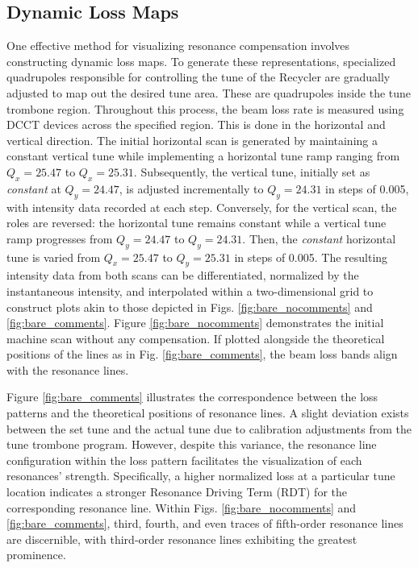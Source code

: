 \subsection{\label{sec:lossmaps}Dynamic Loss Maps}

One effective method for visualizing resonance compensation involves constructing dynamic loss maps. To generate these representations, specialized quadrupoles responsible for controlling the tune of the Recycler are gradually adjusted to map out the desired tune area. These are quadrupoles inside the tune trombone region. Throughout this process, the beam loss rate is measured using DCCT devices across the specified region. This is done in the horizontal and vertical direction. The initial horizontal scan is generated by maintaining a constant vertical tune while implementing a horizontal tune ramp ranging from $Q_x=25.47$ to $Q_x=25.31$. Subsequently, the vertical tune, initially set as \textit{constant} at $Q_y=24.47$, is adjusted incrementally to $Q_y=24.31$ in steps of 0.005, with intensity data recorded at each step. Conversely, for the vertical scan, the roles are reversed: the horizontal tune remains constant while a vertical tune ramp progresses from $Q_y=24.47$ to $Q_y=24.31$. Then, the \textit{constant} horizontal tune is varied from $Q_x=25.47$ to $Q_y=25.31$ in steps of 0.005. The resulting intensity data from both scans can be differentiated, normalized by the instantaneous intensity, and interpolated within a two-dimensional grid to construct plots akin to those depicted in Figs. \ref{fig:bare_nocomments} and \ref{fig:bare_comments}. Figure \ref{fig:bare_nocomments} demonstrates the initial machine scan without any compensation. If plotted alongside the theoretical positions of the lines as in Fig. \ref{fig:bare_comments}, the beam loss bands align with the resonance lines. 

Figure \ref{fig:bare_comments} illustrates the correspondence between the loss patterns and the theoretical positions of resonance lines. A slight deviation exists between the set tune and the actual tune due to calibration adjustments from the tune trombone program. However, despite this variance, the resonance line configuration within the loss pattern facilitates the visualization of each resonances' strength. Specifically, a higher normalized loss at a particular tune location indicates a stronger Resonance Driving Term (RDT) for the corresponding resonance line. Within Figs. \ref{fig:bare_nocomments} and \ref{fig:bare_comments}, third, fourth, and even traces of fifth-order resonance lines are discernible, with third-order resonance lines exhibiting the greatest prominence.

